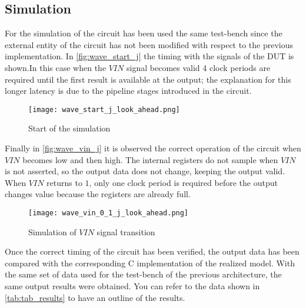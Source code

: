 \subsection{Simulation}
For the simulation of the circuit has been used the same test-bench since the external entity of the circuit has not been modified with respect to the previous implementation.
In \autoref{fig:wave_start_j} the timing with the signals of the DUT is shown.In this case when the $VIN$ signal becomes valid 4 clock periods are required until the first result is available at the output; the explanation for this longer latency is due to the pipeline stages introduced in the circuit.

\begin{figure}[h]
	\center
	\texttt{[image: wave\_start\_j\_look\_ahead.png]}
	\caption{Start of the simulation}
	\label{fig:wave_start_j}
\end{figure}

Finally in \autoref{fig:wave_vin_j} it is observed the correct operation of the circuit when $VIN$ becomes low and then high. The internal registers do not sample when $VIN$ is not asserted, so the output data does not change, keeping the output valid. When $VIN$ returns to $1$, only one clock period is required before the output changes value because the registers are already full.

\begin{figure}[h]
	\center
	\texttt{[image: wave\_vin\_0\_1\_j\_look\_ahead.png]}
	\caption{Simulation of $VIN$ signal transition}
	\label{fig:wave_vin_j}
\end{figure}

Once the correct timing of the circuit has been verified, the output data has been compared with the corresponding C implementation of the realized model. With the same set of data used for the test-bench of the previous architecture, the same output results were obtained. You can refer to the data shown in \autoref{tab:tab_results} to have an outline of the results.